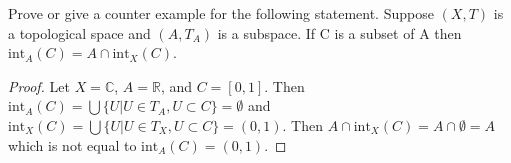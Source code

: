 \setcounter{question}{29}  %
\begin{question}[Fernandez]
  Prove or give a counter example for the following statement. Suppose $(X,T)$ is a topological space and $(A,T_{A})$ is a subspace. If C is a subset of A then $\mbox{int}_{A}(C)=A\cap\mbox{int}_{X}(C)$.
\end{question}
    
\begin{proof}
    Let $X=\mathbb{C}$, $A=\mathbb{R}$, and $C=[0,1]$. Then $\mbox{int}_{A}(C)=\bigcup\{U|U\in T_{A},U\subset C\}=\emptyset$ and $\mbox{int}_{X}(C)=\bigcup\{U|U\in T_{X},U\subset C\}=(0,1)$. Then $A\cap\mbox{int}_{X}(C)=A\cap\emptyset=A$ which is not equal to $\mbox{int}_{A}(C)=(0,1)$.
\end{proof}

